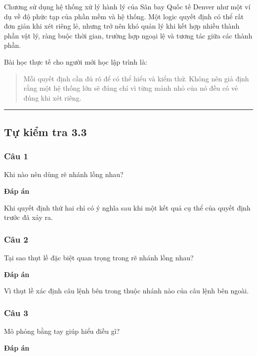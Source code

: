 \documentclass[
  11pt,
  a4paper,
]{article}
\begin{document}
Chương sử dụng hệ thống xử lý hành lý của Sân bay Quốc tế Denver như một
ví dụ về độ phức tạp của phần mềm và hệ thống. Một logic quyết định có
thể rất đơn giản khi xét riêng lẻ, nhưng trở nên khó quản lý khi kết hợp
nhiều thành phần vật lý, ràng buộc thời gian, trường hợp ngoại lệ và
tương tác giữa các thành phần.

Bài học thực tế cho người mới học lập trình là:

\begin{quote}
Mỗi quyết định cần đủ rõ để có thể hiểu và kiểm thử. Không nên giả định
rằng một hệ thống lớn sẽ đúng chỉ vì từng mảnh nhỏ của nó đều có vẻ đúng
khi xét riêng.
\end{quote}

\begin{center}\rule{0.5\linewidth}{0.5pt}\end{center}

\subsection{Tự kiểm tra 3.3}\label{tux1ef1-kiux1ec3m-tra-3.3}

\subsubsection{Câu 1}\label{cuxe2u-1-2}

Khi nào nên dùng rẽ nhánh lồng nhau?

\textbf{Đáp án}

Khi quyết định thứ hai chỉ có ý nghĩa sau khi một kết quả cụ thể của
quyết định trước đã xảy ra.

\subsubsection{Câu 2}\label{cuxe2u-2-2}

Tại sao thụt lề đặc biệt quan trọng trong rẽ nhánh lồng nhau?

\textbf{Đáp án}

Vì thụt lề xác định câu lệnh bên trong thuộc nhánh nào của câu lệnh bên
ngoài.

\subsubsection{Câu 3}\label{cuxe2u-3-2}

Mô phỏng bằng tay giúp hiểu điều gì?

\textbf{Đáp án}
\end{document}
